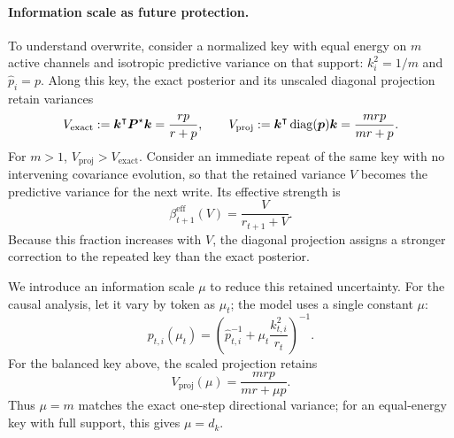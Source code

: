 \documentclass{article} %
\begin{document}
\paragraph{Information scale as future protection.}
To understand overwrite, consider a normalized key with equal energy on $m$ active channels and
isotropic predictive variance on that support: $k_i^2=1/m$ and $\widehat p_i=p$. Along this key,
the exact posterior and its unscaled diagonal projection retain variances
\begin{equation}
  V_{\mathrm{exact}}
  :=\boldsymbol{k}^{\intercal}\boldsymbol{P}^{\star}\boldsymbol{k}
  =\frac{rp}{r+p},
  \qquad
  V_{\mathrm{proj}}
  :=\boldsymbol{k}^{\intercal}\operatorname{diag}(\boldsymbol{p})\boldsymbol{k}
  =\frac{mrp}{mr+p}.
  \label{eq:appendix-balanced-key-mismatch}
\end{equation}
For $m>1$, $V_{\mathrm{proj}}>V_{\mathrm{exact}}$. Consider an immediate repeat of the same key
with no intervening covariance evolution, so that the retained variance $V$ becomes the predictive
variance for the next write. Its effective strength is
\begin{equation}
  \beta_{t+1}^{\mathrm{eff}}(V)
  =\frac{V}{r_{t+1}+V}.
  \label{eq:appendix-variance-write-link}
\end{equation}
Because this fraction increases with $V$, the diagonal projection assigns a stronger correction
to the repeated key than the exact posterior.

We introduce an information scale $\mu$ to reduce this retained uncertainty. For the causal
analysis, let it vary by token as $\mu_t$; the model uses a single constant $\mu$:
\begin{equation}
  p_{t,i}(\mu_t)
  =\left(\widehat p_{t,i}^{-1}
    +\mu_t\frac{k_{t,i}^2}{r_t}\right)^{-1}.
  \label{eq:appendix-protection-scale-update}
\end{equation}
For the balanced key above, the scaled projection retains
\begin{equation}
  V_{\mathrm{proj}}(\mu)=\frac{mrp}{mr+\mu p}.
  \label{eq:appendix-balanced-key-protection}
\end{equation}
Thus $\mu=m$ matches the exact one-step directional variance; for an equal-energy key with full
support, this gives $\mu=d_k$.
\end{document}
